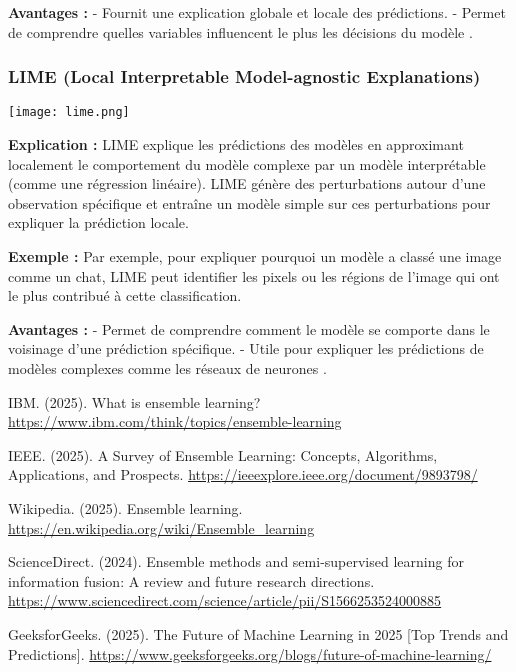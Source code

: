 \documentclass[10pt,a4paper]{article}
\begin{document}
\textbf{Avantages :}
- Fournit une explication globale et locale des prédictions.
- Permet de comprendre quelles variables influencent le plus les décisions du modèle \cite{ml_trends}.

\subsubsection*{LIME (Local Interpretable Model-agnostic Explanations)}

\texttt{[image: lime.png]}

\textbf{Explication :}
LIME explique les prédictions des modèles en approximant localement le comportement du modèle complexe par un modèle interprétable (comme une régression linéaire). LIME génère des perturbations autour d'une observation spécifique et entraîne un modèle simple sur ces perturbations pour expliquer la prédiction locale.

\textbf{Exemple :}
Par exemple, pour expliquer pourquoi un modèle a classé une image comme un chat, LIME peut identifier les pixels ou les régions de l'image qui ont le plus contribué à cette classification.

\textbf{Avantages :}
- Permet de comprendre comment le modèle se comporte dans le voisinage d'une prédiction spécifique.
- Utile pour expliquer les prédictions de modèles complexes comme les réseaux de neurones \cite{ml_trends}.


\begin{thebibliography}{9}
IBM. (2025). What is ensemble learning?
\url{https://www.ibm.com/think/topics/ensemble-learning}

IEEE. (2025). A Survey of Ensemble Learning: Concepts, Algorithms, Applications, and Prospects.
\url{https://ieeexplore.ieee.org/document/9893798/}

Wikipedia. (2025). Ensemble learning.
\url{https://en.wikipedia.org/wiki/Ensemble_learning}

ScienceDirect. (2024). Ensemble methods and semi-supervised learning for information fusion: A review and future research directions.
\url{https://www.sciencedirect.com/science/article/pii/S1566253524000885}

GeeksforGeeks. (2025). The Future of Machine Learning in 2025 [Top Trends and Predictions].
\url{https://www.geeksforgeeks.org/blogs/future-of-machine-learning/}
\end{thebibliography}
\end{document}
